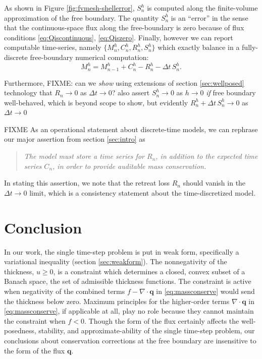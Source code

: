 \documentclass[final,leqno,onefignum,onetabnum]{siamltex1213bueler}
\newcommand\bq{\mathbf{q}}
\newcommand{\Div}{\nabla\cdot}
\begin{document}
As shown in Figure \ref{fig:fvmesh-shellerror}, $S_n^h$ is computed along the finite-volume approximation of the free boundary.  The quantity $S_n^h$ is an ``error'' in the sense that the continuous-space flux along the free-boundary is zero because of flux conditions \eqref{eq:Qiscontinuous}, \eqref{eq:Qiszero}.  Finally, however we can report computable time-series, namely $\{M_n^h,C_n^h,R_n^h,S_n^h\}$ which exactly balance in a fully-discrete free-boundary numerical computation:
\begin{equation}
  M_n^h = M_{n-1}^h + C_n^h - R_n^h - \Delta t\,S_n^h. \label{eq:fvfinalbalance}
\end{equation}

Furthermore, FIXME: can we \emph{show} using extensions of section \ref{sec:wellposed} technology that $R_n\to 0$ as $\Delta t\to 0$?  also assert $S_n^h\to 0$ as $h\to 0$ \emph{if} free boundary well-behaved, which is beyond scope to show, but evidently $R_n^h + \Delta t\,S_n^h \to 0$ as $\Delta t\to 0$

FIXME As an operational statement about discrete-time models, we can rephrase our major assertion from section \ref{sec:intro} as
\begin{quote}
\emph{The model must store a time series for $R_n$, in addition to the expected time series $C_n$, in order to provide auditable mass conservation.}
\end{quote}
In stating this assertion, we note that the retreat loss $R_n$ should vanish in the $\Delta t\to 0$ limit, which is a consistency statement about the time-discretized model.


\section{Conclusion} \label{sec:conclusion}

In our work, the single time-step problem is put in weak form, specifically a variational inequality (section \ref{sec:weakform}).  The nonnegativity of the thickness, $u\ge 0$, is a constraint which determines a closed, convex subset of a Banach space, the set of admissible thickness functions.  The constraint is active when negativity of the combined terms $f - \Div \bq$ in \eqref{eq:massconserve} would send the thickness below zero.  Maximum principles for the higher-order terms $\Div\bq$ in \eqref{eq:massconserve}, if applicable at all, play no role because they cannot maintain the constraint when $f<0$.  Though the form of the flux certainly affects the well-posedness, stability, and approximate-ability of the single time-step problem, our conclusions about conservation corrections at the free boundary are insensitive to the form of the flux $\bq$.
\end{document}
